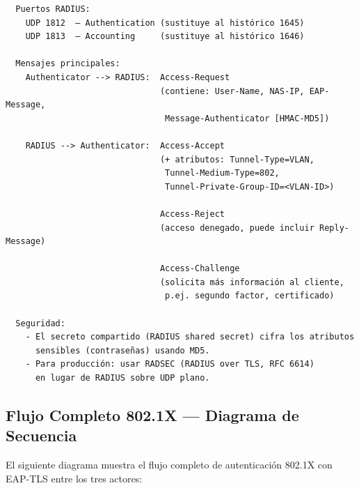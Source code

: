 \begin{lstlisting}
  Puertos RADIUS:
    UDP 1812  — Authentication (sustituye al histórico 1645)
    UDP 1813  — Accounting     (sustituye al histórico 1646)

  Mensajes principales:
    Authenticator --> RADIUS:  Access-Request
                               (contiene: User-Name, NAS-IP, EAP-Message,
                                Message-Authenticator [HMAC-MD5])

    RADIUS --> Authenticator:  Access-Accept
                               (+ atributos: Tunnel-Type=VLAN,
                                Tunnel-Medium-Type=802,
                                Tunnel-Private-Group-ID=<VLAN-ID>)

                               Access-Reject
                               (acceso denegado, puede incluir Reply-Message)

                               Access-Challenge
                               (solicita más información al cliente,
                                p.ej. segundo factor, certificado)

  Seguridad:
    - El secreto compartido (RADIUS shared secret) cifra los atributos
      sensibles (contraseñas) usando MD5.
    - Para producción: usar RADSEC (RADIUS over TLS, RFC 6614)
      en lugar de RADIUS sobre UDP plano.
\end{lstlisting}

\subsection{ Flujo Completo 802.1X --- Diagrama de Secuencia}

El siguiente diagrama muestra el flujo completo de autenticación 802.1X
con EAP-TLS entre los tres actores:

